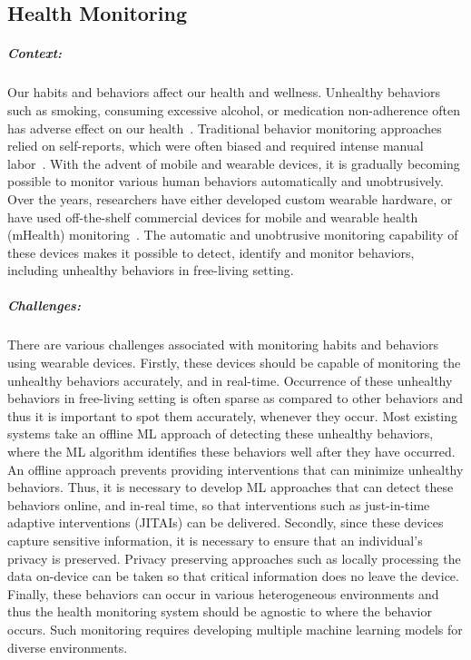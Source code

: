 \subsection{Health Monitoring}

\subparagraph*{Context:} Our habits and behaviors affect our health and wellness. Unhealthy  behaviors such as smoking, consuming excessive alcohol, or medication non-adherence often has adverse effect on our health~\cite{baker2000health,klesges1989smoking,sokol2005impact,white2013burden}. 
Traditional behavior monitoring approaches relied on self-reports, which were often biased and required intense manual labor~\cite{althubaiti2016information}. With the advent of mobile and wearable devices, it is gradually becoming possible to monitor various human behaviors automatically and unobtrusively. 
Over the years, researchers have either developed custom wearable hardware, or have used off-the-shelf commercial devices for mobile and wearable health (mHealth) monitoring~\cite{dong2012new,parate2014risq,ali2012mpuff,sen2020annapurna,bi2018auracle,zhang2020necksense,mishra2020continuous}. The automatic and unobtrusive monitoring capability of these devices makes it possible to detect, identify and monitor behaviors, including unhealthy behaviors in free-living setting.   
        
\subparagraph*{Challenges:} There are various challenges associated with monitoring habits and behaviors using wearable devices. Firstly, these devices should be capable of monitoring the unhealthy behaviors accurately, and in real-time. Occurrence of these unhealthy behaviors in free-living setting is often sparse as compared to other behaviors and thus it is important to spot them accurately, whenever they occur. 
Most existing systems take an offline ML approach of detecting these unhealthy behaviors, where the ML algorithm identifies these behaviors  well after they have occurred. An offline approach prevents providing interventions that can minimize unhealthy behaviors. 
Thus, it is necessary to develop ML approaches that can detect these behaviors online, and in-real time, so that interventions such as just-in-time adaptive interventions (JITAIs) can be delivered. Secondly, since these devices capture sensitive information, it is necessary to ensure that an individual's privacy is preserved. Privacy preserving approaches such as locally processing the data on-device can be taken so that critical information does no leave the device. 
        Finally, these behaviors can occur in various heterogeneous environments and thus the health monitoring system should be agnostic to where the behavior occurs. Such monitoring requires developing multiple machine learning models for diverse environments.  


